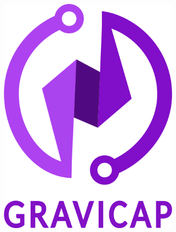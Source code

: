 \documentclass[28pt, a4paper]{report}
\begin{document}
\begin{titlepage}

        \begin{center}      
            \begin{figure} [!ht]
                \centering
                \includegraphics [width=9cm]{Imagenes/Preface/Logo-Nombre.png}
                \label{Logo-Nombre}
            \end{figure}
            

\end{center}
\end{titlepage}
\end{document}
